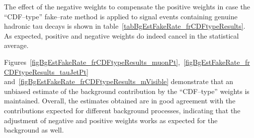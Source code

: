 The effect of the negative weights to compensate the positive weights
in case the ``CDF--type'' fake--rate method is applied 
to signal events containing genuine hadronic tau decays 
is shown in table~\ref{tabBgEstFakeRate_frCDFtypeResults}.
As expected, positive and negative weights do indeed cancel
in the statistical average.


Figures~\ref{figBgEstFakeRate_frCDFtypeResults_muonPt},~\ref{figBgEstFakeRate_frCDFtypeResults_tauJetPt} 
and~\ref{figBgEstFakeRate_frCDFtypeResults_mVisible}
demonstrate that an unbiased estimate of the background contribution by the ``CDF--type'' weights is maintained.
Overall, the estimates obtained are in good agreement with the contributions
expected for different background processes, indicating that the adjustment of negative and positive weights 
works as expected for the background as well.

